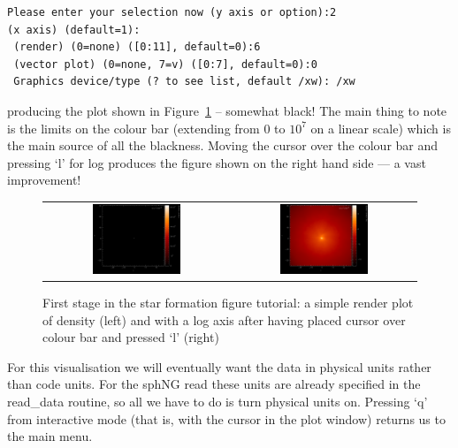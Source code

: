 \documentclass[a4paper,10pt]{article}
\begin{document}
\begin{verbatim}
Please enter your selection now (y axis or option):2
(x axis) (default=1):
 (render) (0=none) ([0:11], default=0):6
 (vector plot) (0=none, 7=v) ([0:7], default=0):0
 Graphics device/type (? to see list, default /xw): /xw
\end{verbatim}
producing the plot shown in Figure~\ref{fig:starpart1} -- somewhat black! The main thing to note is the limits on the colour bar (extending from $0$ to $10^{7}$ on a linear scale) which is the main source of all the blackness. Moving the cursor over the colour bar and pressing `l' for log produces the figure shown on the right hand side --- a vast improvement!
\begin{figure}[h]
\begin{center}
\begin{tabular}{cc}
\includegraphics[width=0.5\textwidth]{starpart1.png} &
\includegraphics[width=0.5\textwidth]{starpart2.png}
\end{tabular}
\caption{First stage in the star formation figure tutorial: a simple render plot of density (left) and with a log axis after having placed cursor over colour bar and pressed `l' (right)}
\label{fig:starpart1}
\end{center}
\end{figure}
For this visualisation we will eventually want the data in physical units rather than code units. For the sphNG read these units are already specified in the read\_data routine, so all we have to do is turn physical units on. Pressing `q' from interactive mode (that is, with the cursor in the plot window) returns us to the main menu.
\end{document}
